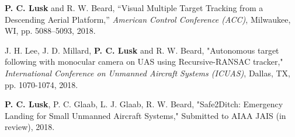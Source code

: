 

\renewcommand{\section}[2]{} %
\begin{thebibliography}{aa}

 \textbf{P. C. Lusk} and R. W. Beard, “Visual Multiple Target Tracking from a Descending Aerial Platform,” \emph{American Control Conference (ACC)}, Milwaukee, WI, pp. 5088–5093, 2018.

 J. H. Lee, J. D. Millard, \textbf{P. C. Lusk} and R. W. Beard, "Autonomous target following with monocular camera on UAS using Recursive-RANSAC tracker," \emph{International Conference on Unmanned Aircraft Systems (ICUAS)}, Dallas, TX, pp. 1070-1074, 2018.

 \textbf{P. C. Lusk}, P. C. Glaab, L. J. Glaab, R. W. Beard, "Safe2Ditch: Emergency Landing for Small Unmanned Aircraft Systems," Submitted to AIAA JAIS (in review), 2018.

\end{thebibliography}